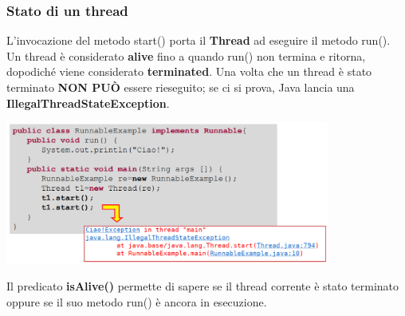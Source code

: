 \documentclass[12pt]{article}
\begin{document}
\subsubsection{Stato di un thread}
L'invocazione del metodo start() porta il \textbf{Thread} ad eseguire il metodo run(). Un thread è considerato \textbf{alive} fino a quando run() non termina e ritorna, dopodiché viene considerato \textbf{terminated}. Una volta che un thread è stato terminato \textbf{NON PUÒ} essere rieseguito; se ci si prova, Java lancia una \textbf{IllegalThreadStateException}.
\begin{center}
    \includegraphics[width = 0.80\textwidth]{Images/71.PNG}
\end{center}
Il predicato \textbf{isAlive()} permette di sapere se il thread corrente è stato terminato oppure se il suo metodo run() è ancora in esecuzione.
\end{document}
